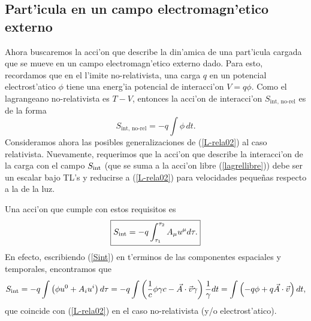 \subsection{Part'icula en un campo electromagn'etico externo}

Ahora buscaremos la acci'on que describe la din'amica de una part'icula cargada
que se mueve en un campo electromagn'etico externo dado. Para esto, recordamos
que en el l'imite no-relativista, una carga $q$ en un potencial electrost'atico
$\phi$ tiene una energ'ia potencial de interacci'on $V=q\phi$. Como el
lagrangeano no-relativista es $T-V$, entonces la acci'on de interacci'on $S_\text{int, no-rel}$ es de la forma
\begin{equation}
S_\text{int, no-rel}= -q\int \phi\, dt. \label{L-rela02}%
\end{equation}
Consideramos ahora las posibles generalizaciones de (\ref{L-rela02}) al caso
relativista. Nuevamente, requerimos que la acci'on que describe la interacci'on
de la carga con el campo $S_{\rm int}$ (que se suma a la acci'on libre
(\ref{lagrellibre})) debe ser un escalar bajo TL's y reducirse a
(\ref{L-rela02}) para velocidades peque\~nas respecto a la de la luz.

Una acci'on que cumple con estos requisitos es
\begin{equation}
\boxed{S_{\rm int}=-q\int_{\tau_1}^{\tau_2}A_\mu u^\mu d\tau.}
\label{Sint}
\end{equation}
En efecto, escribiendo (\ref{Sint}) en t'erminos de las componentes espaciales y
temporales, encontramos que
\begin{equation}
S_{\rm int}=-q\int\left(  \phi u^0+A_i u^i\right)
d\tau=-q\int \left(\frac{1}{c}\phi \gamma c-\vec{A}\cdot\vec{v}\gamma \right)
\frac{1}{\gamma}dt =\int \left(-q\phi+q\vec{A}\cdot\vec{v}\right) dt ,
\label{L-rela03b}%
\end{equation}
que coincide con (\ref{L-rela02}) en el caso no-relativista (y/o
electrost'atico).

